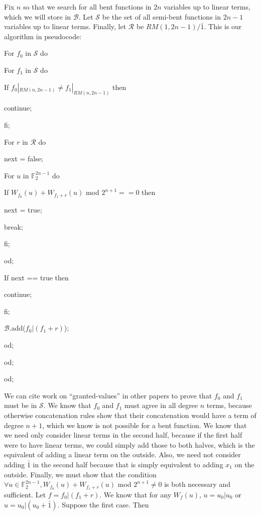 \documentclass[12pt]{amsart}
\newcommand{\F}{\mathbb{F}}
\newcommand{\tab}{\hspace*{2em}}
\begin{document}
Fix $n$ so that we search for all bent functions in $2n$ variables up to linear terms, which we will store in $\mathcal{B}$.  Let $\mathcal{S}$ be the set of all semi-bent functions in $2n-1$ variables up to linear terms.  Finally, let $\mathcal{R}$ be $RM(1,2n-1)/\bar{1}$.  This is our algorithm in pseudocode:

\bigskip

For $f_0$ in $\mathcal{S}$ do

\tab For $f_1$ in $\mathcal{S}$ do

\tab \tab If $f_0|_{RM(n,2n-1)} \neq f_1|_{RM(n,2n-1)}$ then

\tab \tab \tab continue;

\tab \tab fi;

\tab \tab For $r$ in $\mathcal{R}$ do

\tab \tab \tab next = false;

\tab \tab \tab For $u$ in $\F_2^{2n-1}$ do

\tab \tab \tab \tab If $W_{f_0}(u) + W_{f_1+r}(u)$ mod $2^{n+1} == 0$ then

\tab \tab \tab \tab \tab next = true;

\tab \tab \tab \tab \tab break;

\tab \tab \tab \tab fi;

\tab \tab \tab od;

\tab \tab \tab If next == true then

\tab \tab \tab \tab continue;

\tab \tab \tab fi;

\tab \tab \tab $\mathcal{B}$.add($f_0|(f_1+r)$);

\tab \tab od;

\tab od;

od;

\newpage

We can cite work on ``granted-values'' in other papers to prove that $f_0$ and $f_1$ must be in $\mathcal{S}$.  We know that $f_0$ and $f_1$ must agree in all degree $n$ terms, because otherwise concatenation rules show that their concatenation would have a term of degree $n+1$, which we know is not possible for a bent function.  We know that we need only consider linear terms in the second half, because if the first half were to have linear terms, we could simply add those to both halves, which is the equivalent of adding a linear term on the outside.  Also, we need not consider adding $\bar{1}$ in the second half because that is simply equivalent to adding $x_1$ on the outside.  Finally, we must show that the condition $\forall u \in \F_2^{2n-1},W_{f_0}(u) + W_{f_1+r}(u)$ mod $2^{n+1} \neq 0$ is both necessary and sufficient.  Let $f = f_0|\left(f_1+r\right)$.  We know that for any $W_f(u)$, $u = u_0|u_0$ or $u = u_0|(u_0+\bar{1})$.  Suppose the first case.  Then
\end{document}
